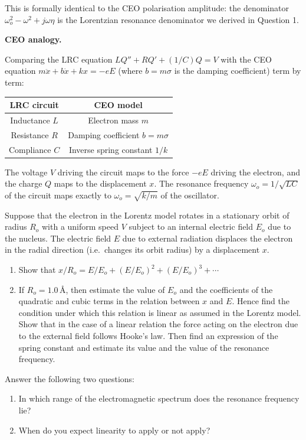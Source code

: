 This is formally identical to the CEO polarisation amplitude: the denominator $\omega_o^2 - \omega^2 + j\omega\eta$ is the Lorentzian resonance denominator we derived in Question 1.

\textbf{CEO analogy.}

Comparing the LRC equation $LQ'' + RQ' + (1/C)Q = V$ with the CEO equation $m\ddot{x} + b\dot{x} + kx = -eE$ (where $b = m\sigma$ is the damping coefficient) term by term:

\begin{center}
\begin{tabular}{cc}
  \toprule
  \textbf{LRC circuit} & \textbf{CEO model} \\
  \midrule
  Inductance $L$ & Electron mass $m$ \\
  Resistance $R$ & Damping coefficient $b = m\sigma$ \\
  Compliance $C$ & Inverse spring constant $1/k$ \\
  \bottomrule
\end{tabular}
\end{center}

The voltage $V$ driving the circuit maps to the force $-eE$ driving the electron, and the charge $Q$ maps to the displacement $x$. The resonance frequency $\omega_o = 1/\sqrt{LC}$ of the circuit maps exactly to $\omega_o = \sqrt{k/m}$ of the oscillator.


\begin{question}[Question 7]Suppose that the electron in the Lorentz model rotates in a stationary
orbit of radius $R_{o}$ with a uniform speed $V$ subject to an internal electric field $E_{o}$
due to the nucleus. The electric field $E$ due to external radiation displaces the electron in
the radial direction (i.e.\ changes its orbit radius) by a displacement $x$.

\begin{enumerate}[label=(\arabic*)]
  \item Show that
        $x/R_{o}=E/E_{o}+(E/E_{o})^{2}+(E/E_{o})^{3}+\cdots$
  \item If $R_{o}=1.0\,\text{\AA}$, then estimate the value of $E_{o}$ and the coefficients of
        the quadratic and cubic terms in the relation between $x$ and $E$. Hence find the
        condition under which this relation is linear as assumed in the Lorentz model. Show that
        in the case of a linear relation the force acting on the electron due to the external
        field follows Hooke's law. Then find an expression of the spring constant and estimate
        its value and the value of the resonance frequency.
\end{enumerate}

Answer the following two questions:
\begin{enumerate}[label=Q(\arabic*)]
  \item In which range of the electromagnetic spectrum does the resonance frequency lie?
  \item When do you expect linearity to apply or not apply?
\end{enumerate}
\end{question}

